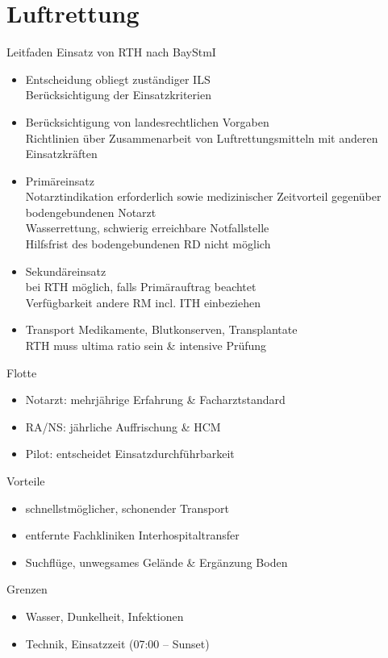\section{Luftrettung}
\begin{sectionbox}{Leitfaden Einsatz von RTH nach BayStmI}
    \begin{itemize}
        \item Entscheidung obliegt zuständiger ILS\\
        \ra Berücksichtigung der Einsatzkriterien
        \item Berücksichtigung von landesrechtlichen Vorgaben\\
        \ra Richtlinien über Zusammenarbeit von Luftrettungsmitteln mit anderen Einsatzkräften
        \item Primäreinsatz\\
        \ra Notarztindikation erforderlich sowie medizinischer Zeitvorteil gegenüber bodengebundenen Notarzt\\
        \ra Wasserrettung, schwierig erreichbare Notfallstelle\\
        \ra Hilfsfrist des bodengebundenen RD nicht möglich
        \item Sekundäreinsatz\\
        \ra bei RTH möglich, falls Primärauftrag beachtet\\
        \ra Verfügbarkeit andere RM incl. ITH einbeziehen
        \item Transport Medikamente, Blutkonserven, Transplantate\\
        \ra RTH muss ultima ratio sein \& intensive Prüfung 
    \end{itemize}
\end{sectionbox}
\begin{sectionbox}{Flotte}
    \begin{itemize}
        \item Notarzt: mehrjährige Erfahrung \& Facharztstandard
        \item RA/NS: jährliche Auffrischung \& HCM
        \item Pilot: entscheidet Einsatzdurchführbarkeit
    \end{itemize}
\end{sectionbox}
\begin{sectionbox}{Vorteile}
    \begin{itemize}
        \item schnellstmöglicher, schonender Transport
        \item entfernte Fachkliniken \ra Interhospitaltransfer
        \item Suchflüge, unwegsames Gelände \& Ergänzung Boden
    \end{itemize}
\end{sectionbox}
\begin{sectionbox}{Grenzen}
    \begin{itemize}
        \item Wasser, Dunkelheit, Infektionen
        \item Technik, Einsatzzeit (07:00 -- Sunset)
    \end{itemize}
\end{sectionbox}